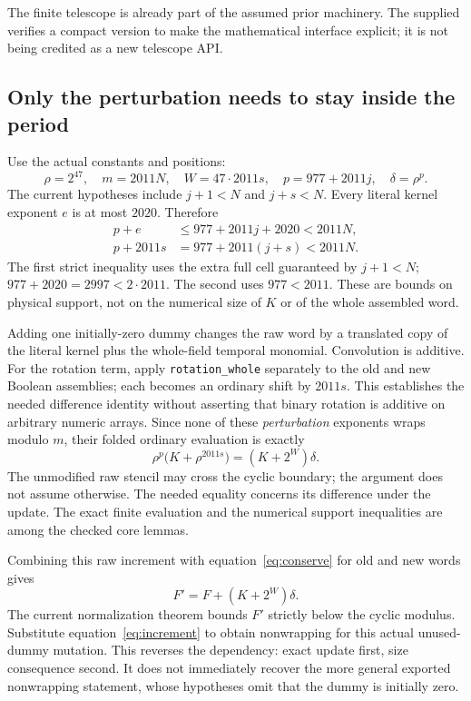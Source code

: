\documentclass[11pt,a4paper]{article}
\newcommand{\code}[1]{\texttt{\small #1}}
\begin{document}
The finite telescope is already part of the assumed prior machinery. The supplied  verifies a compact version to make the mathematical interface explicit; it is not being credited as a new telescope API.

\subsection{Only the perturbation needs to stay inside the period}

Use the actual constants and positions:
\[
 \rho=2^{47},\quad m=2011N,\quad W=47\cdot2011s,
 \quad p=977+2011j,\quad\delta=\rho^p.
\]
The current hypotheses include $j+1<N$ and $j+s<N$. Every literal kernel exponent $e$ is at most $2020$. Therefore
\begin{align*}
 p+e&\le 977+2011j+2020<2011N,\\
 p+2011s&=977+2011(j+s)<2011N.
\end{align*}
The first strict inequality uses the extra full cell guaranteed by $j+1<N$; $977+2020=2997<2\cdot2011$. The second uses $977<2011$. These are bounds on physical support, not on the numerical size of $K$ or of the whole assembled word.

Adding one initially-zero dummy changes the raw word by a translated copy of the literal kernel plus the whole-field temporal monomial. Convolution is additive. For the rotation term, apply \code{rotation\_whole} separately to the old and new Boolean assemblies; each becomes an ordinary shift by $2011s$. This establishes the needed difference identity without asserting that binary rotation is additive on arbitrary numeric arrays. Since none of these \emph{perturbation} exponents wraps modulo $m$, their folded ordinary evaluation is exactly
\[
 \rho^p\bigl(K+\rho^{2011s}\bigr)=(K+2^W)\delta.
\]
The unmodified raw stencil may cross the cyclic boundary; the argument does not assume otherwise. The needed equality concerns its difference under the update. The exact finite evaluation and the numerical support inequalities are among the checked core lemmas.

Combining this raw increment with equation~\eqref{eq:conserve} for old and new words gives
\begin{equation}\label{eq:increment}
 F'=F+(K+2^W)\delta.
\end{equation}
The current normalization theorem bounds $F'$ strictly below the cyclic modulus. Substitute equation~\eqref{eq:increment} to obtain nonwrapping for this actual unused-dummy mutation. This reverses the dependency: exact update first, size consequence second. It does not immediately recover the more general exported nonwrapping statement, whose hypotheses omit that the dummy is initially zero.
\end{document}

